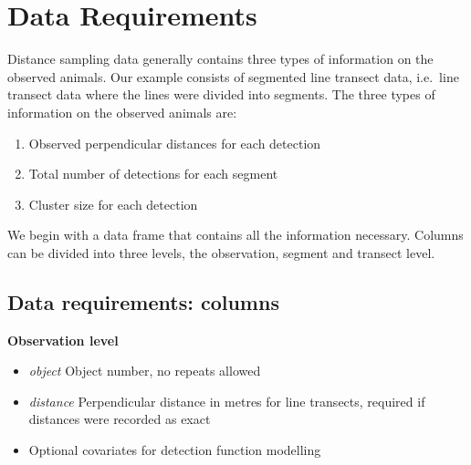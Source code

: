 \section{Data Requirements} 
Distance sampling data generally contains three types of information on the observed animals. Our example consists of segmented line transect data, i.e.\ line transect data where the lines were divided into segments. The three types of information on the observed animals are: 
\begin{enumerate}
\item Observed perpendicular distances for each detection
\item Total number of detections for each segment
\item Cluster size for each detection
\end{enumerate}
We begin with a data frame that contains all the information necessary. Columns can be divided into three levels, the observation, segment and transect level. 
\subsection{Data requirements: columns}
\textbf{Observation level}\\
\begin{itemize}
\item{\textit{object} Object number, no repeats allowed} \\
\item{\textit{distance} Perpendicular distance in metres for line transects, required if distances were recorded as exact}\\
\item{Optional covariates for detection function modelling}\\
\end{itemize}

